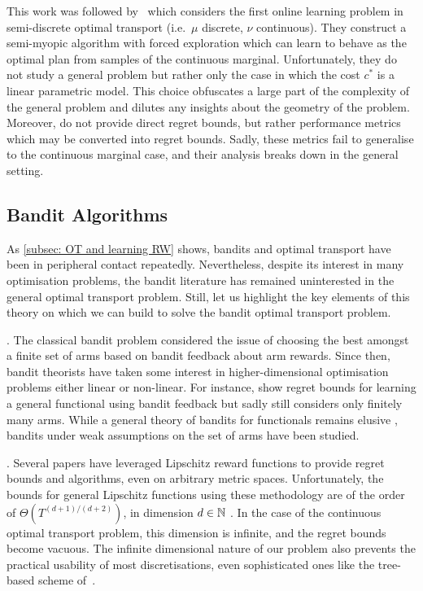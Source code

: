        This work was followed by~\cite{zhu_semidiscrete_2023} which considers the first online learning problem in semi-discrete optimal transport (i.e.\ $\mu$ discrete, $\nu$ continuous). They construct a semi-myopic algorithm with forced exploration which can learn to behave as the optimal plan from samples of the continuous marginal. Unfortunately, they do not study a general problem but rather only the case in which the cost $c^*$ is a linear parametric model. This choice obfuscates a large part of the complexity of the general problem and dilutes any insights about the geometry of the problem.
        Moreover, \cite{zhu_semidiscrete_2023} do not provide direct regret bounds, but rather performance metrics which may be converted into regret bounds. Sadly, these metrics fail to generalise to the continuous marginal case, and their analysis breaks down in the general setting.

\subsection{Bandit Algorithms}

As \cref{subsec: OT and learning RW} shows, bandits and optimal transport have been in peripheral contact repeatedly. Nevertheless, despite its interest in many optimisation problems, the bandit literature has remained  uninterested in the general optimal transport problem. Still, let us highlight the key elements of this theory on which we can build to solve the bandit optimal transport problem. 

. The classical bandit problem \citep{thompson1933likelihood,lai_asymptotically_1985,auer_finite-time_2002} considered the issue of choosing the best amongst a finite set of arms based on bandit feedback about arm rewards. Since then, bandit theorists have taken some interest in higher-dimensional optimisation problems either linear or non-linear. 
For instance, \cite{tran-thanh_functional_2014} show regret bounds for learning a general functional using bandit feedback but sadly still considers only finitely many arms. While a general theory of bandits for functionals remains elusive \citep{wang_beyond_2022}, bandits under weak assumptions on the set of arms have been studied.

. Several papers \citep{bubeck_lipschitz_2011,magureanu_lipschitz_2014,kleinberg_bandits_2019} have leveraged Lipschitz reward functions to provide regret bounds and algorithms, even on arbitrary metric spaces. Unfortunately, the bounds for general Lipschitz functions using these methodology are of the order of $\Theta(T^{{(d+1)}/{(d+2)}})$, in dimension $d\in\mathbb{N}$ \citep{kleinberg_bandits_2019}. In the case of the continuous optimal transport problem, this dimension is infinite, and the regret bounds become vacuous. The infinite dimensional nature of our problem also prevents the practical usability of most discretisations, even sophisticated ones like the tree-based scheme of~\cite{bubeck2011X-armed}. 

